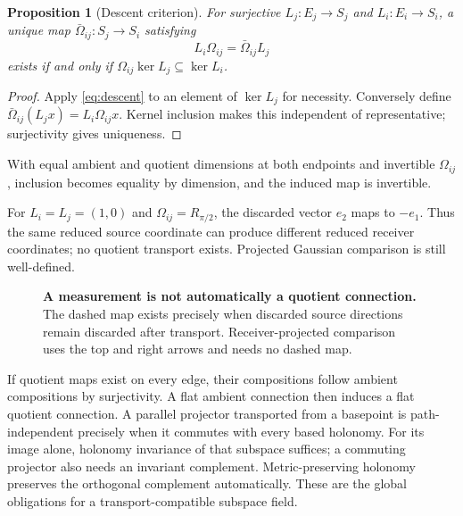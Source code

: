 \documentclass[11pt,letterpaper]{article}
\newtheorem{proposition}{Proposition}[section]
\theoremstyle{remark}
\begin{document}
\begin{proposition}[Descent criterion]
For surjective $L_j:E_j\to S_j$ and $L_i:E_i\to S_i$, a unique map $\bar\Omega_{ij}:S_j\to S_i$ satisfying
\begin{equation}
 L_i\Omega_{ij}=\bar\Omega_{ij}L_j
 \label{eq:descent}
\end{equation}
exists if and only if $\Omega_{ij}\ker L_j\subseteq\ker L_i$.
\end{proposition}
\begin{proof}
Apply \eqref{eq:descent} to an element of $\ker L_j$ for necessity. Conversely define $\bar\Omega_{ij}(L_jx)=L_i\Omega_{ij}x$. Kernel inclusion makes this independent of representative; surjectivity gives uniqueness.
\end{proof}
With equal ambient and quotient dimensions at both endpoints and invertible $\Omega_{ij}$, inclusion becomes equality by dimension, and the induced map is invertible.

For $L_i=L_j=(1,0)$ and $\Omega_{ij}=R_{\pi/2}$, the discarded vector $e_2$ maps to $-e_1$. Thus the same reduced source coordinate can produce different reduced receiver coordinates; no quotient transport exists. Projected Gaussian comparison is still well-defined.

\begin{figure}[tb]
\centering
{}
\caption{\textbf{A measurement is not automatically a quotient connection.} The dashed map exists precisely when discarded source directions remain discarded after transport. Receiver-projected comparison uses the top and right arrows and needs no dashed map.}
\end{figure}

If quotient maps exist on every edge, their compositions follow ambient compositions by surjectivity. A flat ambient connection then induces a flat quotient connection. A parallel projector transported from a basepoint is path-independent precisely when it commutes with every based holonomy. For its image alone, holonomy invariance of that subspace suffices; a commuting projector also needs an invariant complement. Metric-preserving holonomy preserves the orthogonal complement automatically. These are the global obligations for a transport-compatible subspace field.
\end{document}
